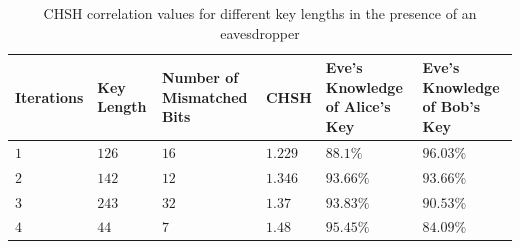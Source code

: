 \documentclass[a4paper]{cas-sc}
\begin{document}
\begin{table}[pos=h]
    \begin{center}
        \caption{CHSH correlation values for different key lengths in the presence of an eavesdropper}
        \begin{tabularx}{\textwidth}{>{\centering\arraybackslash}X>{\centering\arraybackslash}X>{\centering\arraybackslash}X>{\centering\arraybackslash}X>{\centering\arraybackslash}X>{\centering\arraybackslash}X}
            \hline
            Iterations & Key Length & Number of Mismatched Bits & CHSH    & Eve's Knowledge of Alice's Key & Eve's Knowledge of Bob's Key \\ \hline
            $1$        & $126$      & $16$                      & $1.229$ & $88.1\%$                       & $96.03\%$                    \\
            $2$        & $142$      & $12$                      & $1.346$ & $93.66\%$                      & $93.66\%$                    \\
            $3$        & $243$      & $32$                      & $1.37$  & $93.83\%$                      & $90.53\%$                    \\
            $4$        & $44$       & $7$                       & $1.48$  & $95.45\%$                      & $84.09\%$                    \\
            \hline
        \end{tabularx}
        \label{table:chshEveKnowledge}
    \end{center}
\end{table}
\end{document}
